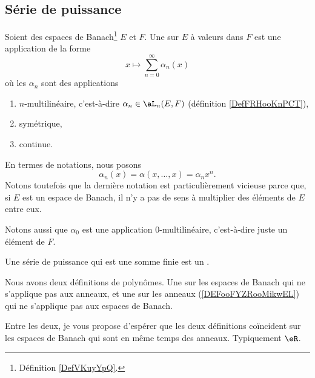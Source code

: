 \subsection{Série de puissance}


\begin{definition}	\label{DEFooIXGBooPgJTzB}
	Soient des espaces de Banach\footnote{Définition \ref{DefVKuyYpQ}.} \( E\) et \( F\).
	Une  sur \( E\) à valeurs dans \( F\) est une application de la forme
	\begin{equation}
		x\mapsto \sum_{n=0}^{\infty}\alpha_n(x)
	\end{equation}
	où les \( \alpha_n\) sont des applications
	\begin{enumerate}
		\item
		      \( n\)-multilinéaire, c'est-à-dire \( \alpha_n\in \aL_n(E,F)\) (définition \ref{DefFRHooKnPCT}),
		\item
		      symétrique,
		\item
		      continue.
	\end{enumerate}
	En termes de notations, nous posons
	\begin{equation}
		\alpha_n(x)=\alpha(x,\ldots,x)=\alpha_nx^n.
	\end{equation}
	Notons toutefois que la dernière notation est particulièrement vicieuse parce que, si \( E\) est un espace de Banach, il n'y a pas de sens à multiplier des éléments de \( E\) entre eux.

	Notons aussi que \( \alpha_0\) est une application \( 0\)-multilinéaire, c'est-à-dire juste un élément de \( F\).
\end{definition}

\begin{definition}	\label{DEFooZUYHooDwwRfp}
	Une série de puissance qui est une somme finie est un .
\end{definition}


\begin{normaltext}
	Nous avons deux définitions de polynômes. Une sur les espaces de Banach qui ne s'applique pas aux anneaux, et une sur les anneaux (\ref{DEFooFYZRooMikwEL}) qui ne s'applique pas aux espaces de Banach.

	Entre les deux, je vous propose d'espérer que les deux définitions coïncident sur les espaces de Banach qui sont en même temps des anneaux. Typiquement \( \eR\).
\end{normaltext}

